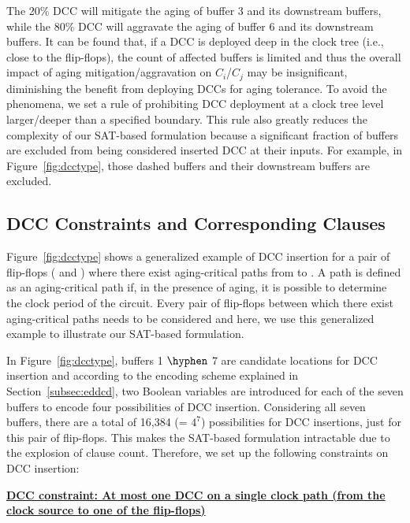 The 20\% DCC will mitigate the aging of buffer 3 and its downstream buffers, while the 80\% DCC will aggravate the aging of buffer 6 and its downstream buffers. It can be found that, if a DCC is deployed deep in the clock tree (i.e., close to the flip-flops), the count of affected buffers is limited and thus the overall impact of aging mitigation/aggravation on $C_i$/$C_j$ may be insignificant, diminishing the benefit from deploying DCCs for aging tolerance.  To avoid the phenomena, we set a rule of prohibiting DCC deployment at a clock tree level larger/deeper than a specified boundary. This rule also greatly reduces the complexity of our SAT-based formulation because a significant fraction of buffers are excluded from being considered inserted DCC at their inputs. For example, in Figure~\ref{fig:dcctype}, those dashed buffers and their downstream buffers are excluded. 

\subsection{DCC Constraints and Corresponding Clauses}
\label{subsec:dccccc}

Figure~\ref{fig:dcctype} shows a generalized example of DCC insertion for a pair of flip-flops ( and ) where there exist aging-critical paths from  to . A path is defined as an aging-critical path if, in the presence of aging, it is possible to determine the clock period of the circuit. Every pair of flip-flops between which there exist aging-critical paths needs to be considered and here, we use this generalized example to illustrate our SAT-based formulation.

In Figure~\ref{fig:dcctype}, buffers 1 $\hyphen$ 7 are candidate locations for DCC insertion and according to the encoding scheme explained in Section~\ref{subsec:eddcd}, two Boolean variables are introduced for each of the seven buffers to encode four possibilities of DCC insertion. Considering all seven buffers, there are a total of 16,384 (= $4^7$) possibilities for DCC insertions, just for this pair of flip-flops. This makes the SAT-based formulation intractable due to the explosion of clause count. Therefore, we set up the following constraints on DCC insertion: 

{\noindent \textbf{\uline{DCC constraint: At most one DCC on a single clock path (from the clock source to one of the flip-flops)}}}

